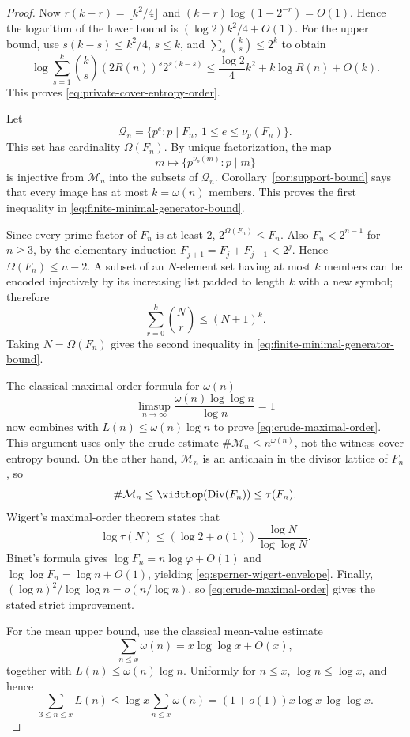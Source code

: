 \begin{proof}
Now $r(k-r)=\lfloor k^2/4\rfloor$ and
$(k-r)\log(1-2^{-r})=O(1)$. Hence the logarithm of the lower bound is
$(\log2)k^2/4+O(1)$. For the upper bound, use
$s(k-s)\le k^2/4$, $s\le k$, and
$\sum_s\binom{k}{s}\le2^k$ to obtain
\[
 \log\sum_{s=1}^{k}\binom{k}{s}(2R(n))^s2^{s(k-s)}
 \le\frac{\log2}{4}k^2+k\log R(n)+O(k).
\]
This proves \eqref{eq:private-cover-entropy-order}.

Let
\[
 \mathcal Q_n=\{p^e:p\mid F_n,\ 1\le e\le\nu_p(F_n)\}.
\]
This set has cardinality $\Omega(F_n)$.  By unique factorization, the map
\[
 m\longmapsto\{p^{\nu_p(m)}:p\mid m\}
\]
is injective from $\mathcal M_n$ into the subsets of $\mathcal Q_n$.
Corollary~\ref{cor:support-bound} says that every image has at most
$k=\omega(n)$ members.  This proves the first inequality in
\eqref{eq:finite-minimal-generator-bound}.

Since every prime factor of $F_n$ is at least $2$,
$2^{\Omega(F_n)}\le F_n$.  Also $F_n<2^{n-1}$ for $n\ge3$, by the elementary
induction $F_{j+1}=F_j+F_{j-1}<2^j$.  Hence
$\Omega(F_n)\le n-2$.  A subset of an $N$-element set having at most $k$
members can be encoded injectively by its increasing list padded to length
$k$ with a new symbol; therefore
\[
 \sum_{r=0}^k\binom Nr\le(N+1)^k.
\]
Taking $N=\Omega(F_n)$ gives the second inequality in
\eqref{eq:finite-minimal-generator-bound}.

The classical maximal-order formula for $\omega(n)$
\cite[Theorem~22.11]{HardyWright2008Introduction}
\[
 \limsup_{n\to\infty}
 \frac{\omega(n)\log\log n}{\log n}=1
\]
now combines with $L(n)\le\omega(n)\log n$ to prove
\eqref{eq:crude-maximal-order}. This argument uses only the crude estimate
$\#\mathcal M_n\le n^{\omega(n)}$, not the witness-cover entropy bound. On
the other hand,
$\mathcal M_n$ is an antichain in the divisor lattice of $F_n$, so
\[
 \#\mathcal M_n\le\widthop(\operatorname{Div}(F_n))\le\tau(F_n).
\]
Wigert's maximal-order theorem \cite{Wigert1907Divisors} states that
\[
 \log\tau(N)\le(\log2+o(1))\frac{\log N}{\log\log N}.
\]
Binet's formula gives $\log F_n=n\log\varphi+O(1)$ and
$\log\log F_n=\log n+O(1)$, yielding
\eqref{eq:sperner-wigert-envelope}.  Finally,
$(\log n)^2/\log\log n=o(n/\log n)$, so
\eqref{eq:crude-maximal-order} gives the stated strict improvement.

For the mean upper bound, use the classical mean-value estimate
\cite{HardyRamanujan1917NormalPrimeFactors}
\begin{equation}
\label{eq:mean-omega-input}
 \sum_{n\le x}\omega(n)=x\log\log x+O(x),
\end{equation}
together with $L(n)\le\omega(n)\log n$.  Uniformly for $n\le x$,
$\log n\le\log x$, and hence
\[
 \sum_{3\le n\le x}L(n)
 \le\log x\sum_{n\le x}\omega(n)
 =(1+o(1))x\log x\,\log\log x.
\]


\end{proof}
